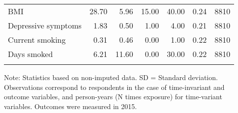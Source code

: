 \begin{table}[htp]
\begin{threeparttable}
\begin{tabular}{lrrrrrr}
  BMI & 28.70 & 5.96 & 15.00 & 40.00 & 0.24 & 8810 \\ 
  Depressive symptoms & 1.83 & 0.50 & 1.00 & 4.00 & 0.21 & 8810 \\ 
  Current smoking & 0.31 & 0.46 & 0.00 & 1.00 & 0.22 & 8810 \\ 
  Days smoked & 6.21 & 11.60 & 0.00 & 30.00 & 0.22 & 8810 \\ 
   \addlinespace
\hline
\addlinespace
\end{tabular}
\endgroup
\begin{tablenotes}
\scriptsize
\item Note: Statistics based on non-imputed data. SD = Standard deviation.
    Observations correspond to respondents
    in the case of time-invariant and outcome variables, and person-years (N times exposure) for
    time-variant variables. Outcomes were measured in 2015.
\end{tablenotes}
\end{threeparttable}
\end{table}
